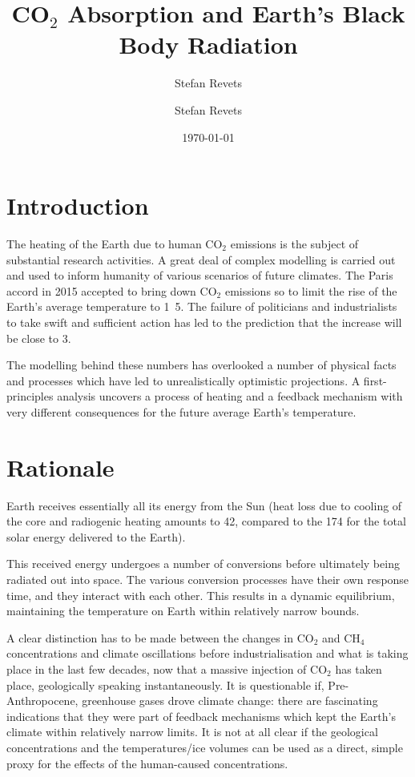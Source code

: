 \documentclass[10pt,a4paper,titlepage]{article}
\author{Stefan Revets}
\author{Stefan Revets}
\date{\today}
\title{CO$_{\text{2}}$ Absorption and Earth's Black Body Radiation}
\begin{document}
\maketitle
\tableofcontents


\section{Introduction}
\label{sec-1}
The heating of the Earth due to human CO$_{\text{2}}$ emissions is the subject
of substantial research activities. A great deal of complex modelling
is carried out and used to inform humanity of various scenarios of
future climates. The Paris accord in 2015 accepted to bring down
CO$_{\text{2}}$ emissions so to limit the rise of the Earth's average
temperature to \unit{1.5}{\celsius}. The failure of politicians and
industrialists to take swift and sufficient action has led to the
prediction that the increase will be close to \unit{3}{\celsius}.

The modelling behind these numbers has overlooked a number of physical
facts and processes which have led to unrealistically optimistic
projections. A first-principles analysis uncovers a process of heating
and a feedback mechanism with very different consequences for the
future average Earth's temperature.

\section{Rationale}
\label{sec-2}
Earth receives essentially all its energy from the Sun (heat loss due
to cooling of the core and radiogenic heating amounts to
\unit{42}{\terad\watt}, compared to the \unit{174}{\petad\watt}
for the total solar energy delivered to the Earth). 

This received energy undergoes a number of conversions before
ultimately being radiated out into space. The various conversion
processes have their own response time, and they interact with each
other. This results in a dynamic equilibrium, maintaining the
temperature on Earth within relatively narrow bounds.

A clear distinction has to be made between the changes in CO$_{\text{2}}$ and
CH$_{\text{4}}$ concentrations and climate oscillations before
industrialisation and what is taking place in the last few decades,
now that a massive injection of CO$_{\text{2}}$ has taken place, geologically
speaking instantaneously. It is questionable if, Pre-Anthropocene,
greenhouse gases drove climate change: there are fascinating
indications that they were part of feedback mechanisms which kept the
Earth's climate within relatively narrow limits. It is not at all
clear if the geological concentrations and the temperatures/ice
volumes can be used as a direct, simple proxy for the effects of the
human-caused concentrations.
\end{document}
